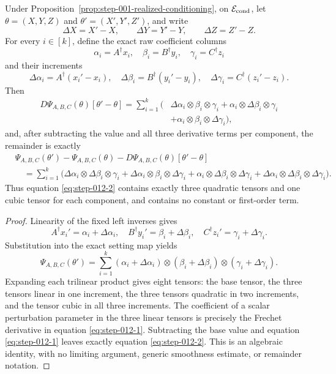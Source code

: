 \begin{lemma}
\label{lem:step-012-exact-expansion}
Under Proposition~\ref{prop:step-001-realized-conditioning}, on
\(\mathcal E_{\rm cond}\), let
\(\theta=(X,Y,Z)\) and \(\theta'=(X',Y',Z')\), and write
\[
  \Delta X=X'-X,\qquad \Delta Y=Y'-Y,\qquad \Delta Z=Z'-Z.
\]
For every \(i\in[k]\), define the exact raw coefficient columns
\[
  \alpha_i=A^\dagger x_i,\quad
  \beta_i=B^\dagger y_i,\quad
  \gamma_i=C^\dagger z_i
\]
and their increments
\[
  \Delta\alpha_i=A^\dagger(x_i'-x_i),\quad
  \Delta\beta_i=B^\dagger(y_i'-y_i),\quad
  \Delta\gamma_i=C^\dagger(z_i'-z_i).
\]
Then
\begin{equation}
\begin{aligned}
  D\Psi_{A,B,C}(\theta)[\theta'-\theta]
  =\sum_{i=1}^k\bigl(&
      \Delta\alpha_i\otimes\beta_i\otimes\gamma_i
      +\alpha_i\otimes\Delta\beta_i\otimes\gamma_i\\
      &+\alpha_i\otimes\beta_i\otimes\Delta\gamma_i
    \bigr),
\end{aligned}\label{eq:step-012-1}
\end{equation}
and, after subtracting the value and all three derivative terms per
component, the remainder is exactly
\begin{equation}
\begin{aligned}
  &\Psi_{A,B,C}(\theta')-\Psi_{A,B,C}(\theta)
       -D\Psi_{A,B,C}(\theta)[\theta'-\theta]\\
  &\quad=\sum_{i=1}^k\bigl(
      \Delta\alpha_i\otimes\Delta\beta_i\otimes\gamma_i
      +\Delta\alpha_i\otimes\beta_i\otimes\Delta\gamma_i
      +\alpha_i\otimes\Delta\beta_i\otimes\Delta\gamma_i
      +\Delta\alpha_i\otimes\Delta\beta_i\otimes
        \Delta\gamma_i
    \bigr).
\end{aligned}\label{eq:step-012-2}
\end{equation}
Thus equation \eqref{eq:step-012-2} contains exactly three quadratic tensors and one cubic
tensor for each component, and contains no constant or first-order term.

\end{lemma}

\begin{proof}
Linearity of the fixed left inverses gives
\[
  A^\dagger x_i'=\alpha_i+\Delta\alpha_i,
  \quad B^\dagger y_i'=\beta_i+\Delta\beta_i,
  \quad C^\dagger z_i'=\gamma_i+\Delta\gamma_i.
\]
Substitution into the exact setting map yields
\[
  \Psi_{A,B,C}(\theta')
  =\sum_{i=1}^k
    (\alpha_i+\Delta\alpha_i)
    \otimes(\beta_i+\Delta\beta_i)
    \otimes(\gamma_i+\Delta\gamma_i).
\]
Expanding each trilinear product gives eight tensors: the base tensor, the
three tensors linear in one increment, the three tensors quadratic in two
increments, and the tensor cubic in all three increments. The coefficient
of a scalar perturbation parameter in the three linear tensors is precisely
the Frechet derivative in equation \eqref{eq:step-012-1}. Subtracting the base value and
equation \eqref{eq:step-012-1} leaves exactly equation \eqref{eq:step-012-2}. This is an algebraic identity, with
no limiting argument, generic smoothness estimate, or remainder notation.


\end{proof}


